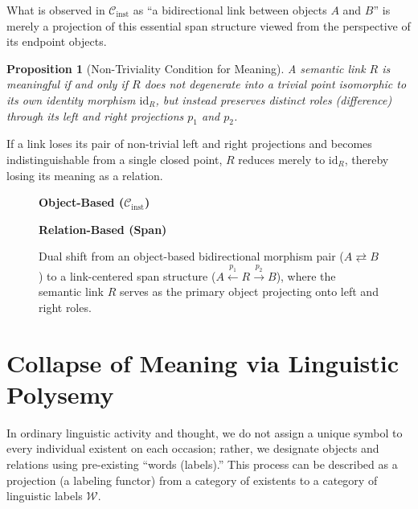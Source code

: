 \documentclass[11pt,a4paper]{article}
\theoremstyle{definition}
\theoremstyle{plain}
\newtheorem{proposition}[definition]{Proposition}
\begin{document}
What is observed in $\mathcal{C}_{\mathrm{inst}}$ as ``a bidirectional link between objects $A$ and $B$'' is merely a projection of this essential span structure viewed from the perspective of its endpoint objects.

\begin{proposition}[Non-Triviality Condition for Meaning]
A semantic link $R$ is meaningful if and only if $R$ does not degenerate into a trivial point isomorphic to its own identity morphism $\mathrm{id}_{R}$, but instead preserves distinct roles (difference) through its left and right projections $p_1$ and $p_2$.
\end{proposition}

If a link loses its pair of non-trivial left and right projections and becomes indistinguishable from a single closed point, $R$ reduces merely to $\mathrm{id}_{R}$, thereby losing its meaning as a relation.

\begin{figure}[htbp]
\centering
\begin{minipage}{0.42\textwidth}
\centering
\textbf{Object-Based ($\mathcal{C}_{\mathrm{inst}}$)}\\[1.2em]
\end{minipage}
\hfill
\begin{minipage}{0.52\textwidth}
\centering
\textbf{Relation-Based (Span)}\\[1.2em]
\end{minipage}
\caption{Dual shift from an object-based bidirectional morphism pair ($A \rightleftarrows B$) to a link-centered span structure ($A \xleftarrow{p_1} R \xrightarrow{p_2} B$), where the semantic link $R$ serves as the primary object projecting onto left and right roles.}
\label{fig:span_shift}
\end{figure}

\section{Collapse of Meaning via Linguistic Polysemy}

In ordinary linguistic activity and thought, we do not assign a unique symbol to every individual existent on each occasion; rather, we designate objects and relations using pre-existing ``words (labels).'' This process can be described as a projection (a labeling functor) from a category of existents to a category of linguistic labels $\mathcal{W}$.
\end{document}
